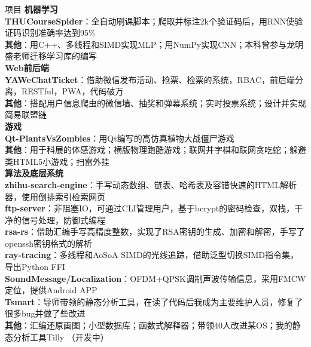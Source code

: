 \documentclass{resume}
\begin{document}
\begin{rSection}{项目}
\hspace*{-0.2in}\textbf{机器学习}\\
\textbf{THUCourseSpider}：全自动刷课脚本；爬取并标注2k个验证码后，用RNN使验证码识别准确率达到95\%\\
\textbf{其他}：用C++、多线程和SIMD实现MLP；用NumPy实现CNN；本科曾参与龙明盛老师迁移学习库的编写\\
\hspace*{-0.2in}\textbf{Web前后端}\\
\textbf{YAWeChatTicket}：借助微信发布活动、抢票、检票的系统，RBAC，前后端分离，RESTful，PWA，代码破万\\
\textbf{其他}：搭配用户信息爬虫的微信墙、抽奖和弹幕系统；实时投票系统；设计并实现简易联盟链\\
\hspace*{-0.2in}\textbf{游戏}\\
\textbf{Qt-PlantsVsZombies}：用Qt编写的高仿真植物大战僵尸游戏\\
\textbf{其他}：用于科展的体感游戏；横版物理跑酷游戏；联网井字棋和联网贪吃蛇；躲避类HTML5小游戏；扫雷外挂\\
\hspace*{-0.2in}\textbf{算法及底层系统}\\
\textbf{zhihu-search-engine}：手写动态数组、链表、哈希表及容错快速的HTML解析器，使用倒排索引检索网页\\
\textbf{ftp-server}：非阻塞IO，可通过CLI管理用户，基于bcrypt的密码检查，双栈，干净的信号处理，防御式编程\\
\textbf{rsa-rs}：借助汇编手写高精度整数，实现了RSA密钥的生成、加密和解密，手写了openssh密钥格式的解析\\
\textbf{ray-tracing}：多线程和AoSoA SIMD的光线追踪，借助泛型切换SIMD指令集，导出Python FFI\\
\textbf{SoundMessage/Localization}：OFDM+QPSK调制声波传输信息，采用FMCW定位，提供Android APP\\
\textbf{Tsmart}：导师带领的静态分析工具，在读了代码后我成为主要维护人员，修复了很多bug并做了些改进\\
\textbf{其他}：汇编还原画图；小型数据库；函数式解释器；带领40人改进某OS；我的静态分析工具Tilly
（开发中）
\end{rSection}
\end{document}
